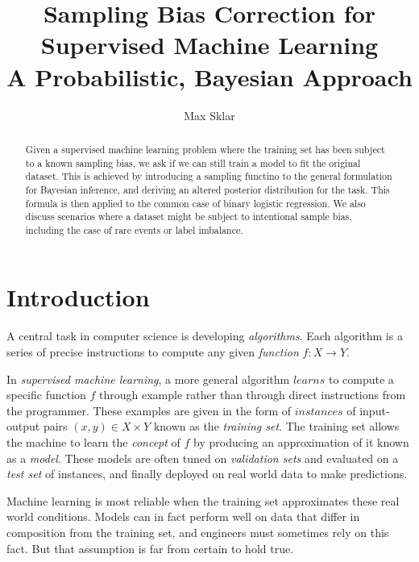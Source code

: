 \documentclass[twoside]{article}
\begin{document}
\parindent=0in
\parskip=12pt


\title{
  Sampling Bias Correction for Supervised Machine Learning \\
  \large{
    A  Probabilistic, Bayesian Approach
  }
}

\author{Max Sklar}

\maketitle
\thispagestyle{empty}

\begin{abstract}
Given a supervised machine learning problem where the training set has been subject to a known sampling bias, we ask if we can still train a model to fit the original dataset. This is achieved by introducing a sampling functino to the general formulation for Bayesian inference, and deriving an altered posterior distribution for the task. This formula is then applied to the common case of binary logistic regression. We also discuss scenarios where a dataset might be subject to intentional sample bias, including the case of rare events or label imbalance.
\end{abstract}

\section{Introduction}
\label{section:introduction}

A central task in computer science is developing \textit{algorithms}. Each algorithm is a series of precise instructions to compute any given \textit{function} \(f: X \to Y\).

In \textit{supervised machine learning}, a more general algorithm \(learns\) to compute a specific function \(f\) through example rather than through direct instructions from the programmer. These examples are given in the form of \(instances\) of input-output pairs \((x, y) \in X \times Y\) known as the \textit{training set}. The training set allows the machine to learn the \textit{concept} of \(f\) by producing an approximation of it known as a \textit{model}. These models are often tuned on \textit{validation sets} and evaluated on a \textit{test set} of instances, and finally deployed on real world data to make predictions.

Machine learning is most reliable when the training set approximates these real world conditions. Models can in fact perform well on data that differ in composition from the training set, and engineers must sometimes rely on this fact. But that assumption is far from certain to hold true.
\end{document}
